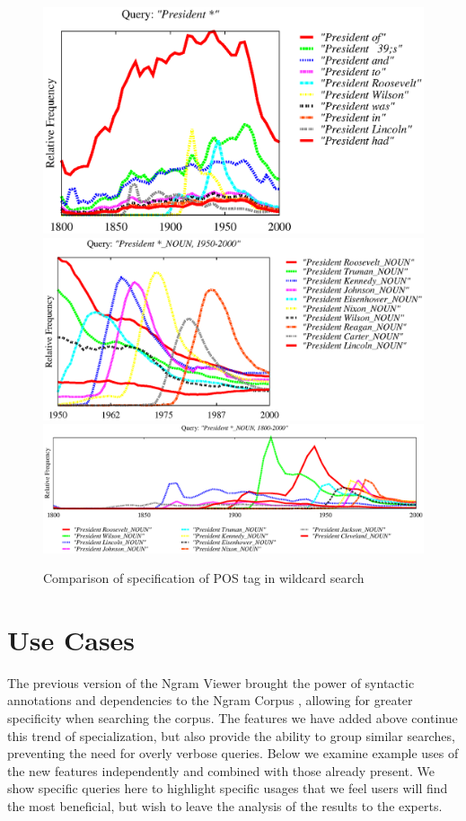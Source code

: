 \documentclass[11pt]{article}
\begin{document}
\begin{figure}
\includegraphics[width=.46\textwidth]{graphs/president*_all}
\includegraphics[width=.54\textwidth]{graphs/President*1950}
\includegraphics[width=\textwidth]{graphs/President*1800}
\caption{\label{fig:president} Comparison of specification of POS tag in wildcard search}
\end{figure}
\section{Use Cases}
\label{sec:usecases}
The previous version of the Ngram Viewer brought the power of syntactic annotations and dependencies to the Ngram Corpus \cite{lin2012syntactic}, allowing for greater specificity when searching the corpus. The features we have added above continue this trend of specialization, but also provide the ability to group similar searches, preventing the need for overly verbose queries. Below we examine example uses of the new features independently and combined with those already present. We show specific queries here to highlight specific usages that we feel users will find the most beneficial, but wish to leave the analysis of the results to the experts.
\end{document}
